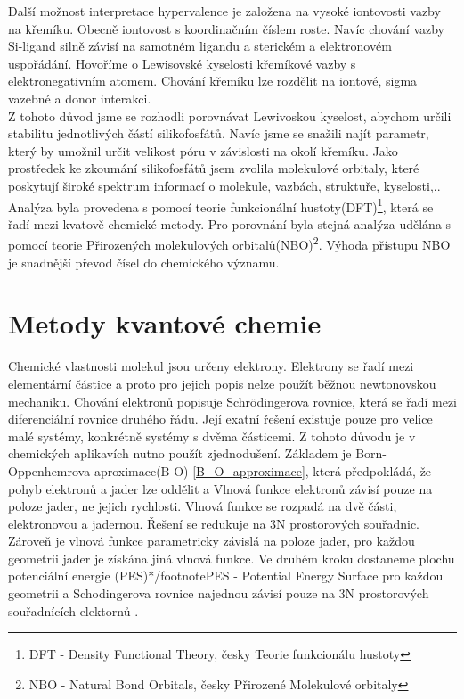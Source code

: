 \documentclass[
  digital, %
  table,   %
  lof,     %
  lot,     %
]{fithesis3}
\begin{document}
Další možnost interpretace hypervalence je založena na vysoké iontovosti vazby na křemíku. Obecně iontovost s koordinačním číslem roste.
Navíc chování vazby Si-ligand silně závisí na samotném ligandu a sterickém a elektronovém uspořádání. Hovoříme o Lewisovské kyselosti křemíkové vazby s elektronegativním atomem. Chování křemíku lze rozdělit na iontové, sigma vazebné a donor interakci.\cite{Wagler2014}\\

Z tohoto důvod jsme se rozhodli porovnávat Lewivoskou kyselost, abychom určili stabilitu jednotlivých částí silikofosfátů. Navíc jsme se snažili najít parametr, který by umožnil určit velikost póru v závislosti na okolí křemíku. Jako prostředek ke zkoumání silikofosfátů jsem zvolila molekulové orbitaly, které poskytují široké spektrum informací o molekule, vazbách, struktuře, kyselosti,..  Analýza byla provedena s pomocí teorie funkcionální hustoty(DFT)\footnote{DFT - Density Functional Theory, česky Teorie funkcionálu hustoty}, která se řadí mezi kvatově-chemické metody. Pro porovnání byla stejná analýza udělána s pomocí teorie Přirozených molekulových orbitalů(NBO)\footnote{NBO - Natural Bond Orbitals, česky Přirozené Molekulové orbitaly}. Výhoda přístupu NBO je snadnější převod čísel do chemického významu.


\section{Metody kvantové chemie}
Chemické vlastnosti molekul jsou určeny elektrony. Elektrony se řadí mezi elementární částice a proto pro jejich popis nelze použít běžnou newtonovskou mechaniku. Chování elektronů popisuje Schrödingerova rovnice, která se řadí mezi diferenciální rovnice druhého řádu. Její exatní řešení existuje pouze pro velice malé systémy, konkrétně systémy s dvěma částicemi. Z tohoto důvodu je v chemických aplikavích nutno použít zjednodušení. Základem je Born-Oppenhemrova aproximace(B-O) \ref{B_O_approximace}, která předpokládá, že pohyb elektronů a jader lze oddělit a Vlnová funkce elektronů závisí pouze na poloze jader, ne jejich rychlosti. Vlnová funkce se rozpadá na dvě části, elektronovou a jadernou. Řešení se redukuje na 3N prostorových souřadnic. Zároveň je vlnová funkce parametricky závislá na poloze jader, pro každou geometrii jader je získána jiná vlnová funkce. Ve druhém kroku dostaneme plochu potenciální energie (PES)*/footnote{PES - Potential Energy Surface} pro každou geometrii a Schodingerova rovnice najednou závisí pouze na 3N prostorových souřadnících elektornů \cite{lechamolecularmodeling}.
\end{document}
